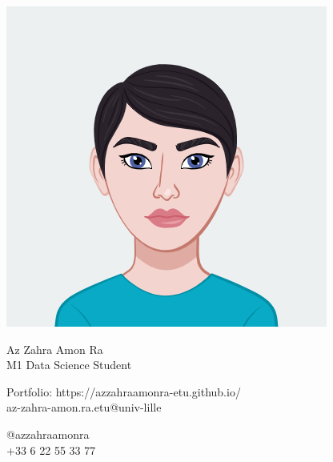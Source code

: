 \documentclass{article}
\begin{document}
\centering
\includegraphics[width=.25\linewidth]{new_logo.png}\\[1pt] %

\parbox{2in}{\Large \centering Az Zahra Amon Ra\\[1pt]
\normalsize M1 Data Science Student}

\vfill

\raggedright
\begin{multicols}{2}
\fontsize{7}{10}\selectfont Portfolio: https://azzahraamonra-etu.github.io/\\
\fontsize{7}{10}\selectfont az-zahra-amon.ra.etu@univ-lille

\columnbreak
\raggedleft
@azzahraamonra\\
+33 6 22 55 33 77%

\end{multicols}%
\end{document}
